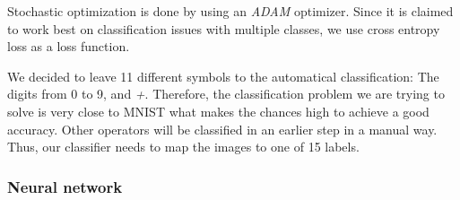 \documentclass[12pt]{article}
\begin{document}
		Stochastic optimization is done by using an \textit{ADAM}\cite{adam} optimizer. Since it is claimed to work best on classification issues with multiple classes, we use cross entropy loss as a loss function.
		
		We decided to leave 11 different symbols to the automatical classification: The digits from 0 to 9,  and \textit{+}. Therefore, the classification problem we are trying to solve is very close to MNIST what makes the chances high to achieve a good accuracy. Other operators will be classified in an earlier step in a manual way. Thus, our classifier needs to map the images to one of 15 labels.
				
		\subsubsection{Neural network}
		
\end{document}

